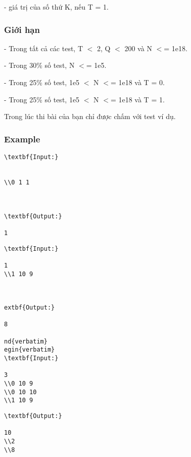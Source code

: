 - giá trị của số thứ K, nếu T = 1.

\subsubsection{Giới hạn}

- Trong tất cả các test, T $<$ 2, Q $<$ 200 và N $<$= 1e18.

- Trong 30\% số test, N $<$= 1e5.

- Trong 25\% số test, 1e5 $<$ N $<$= 1e18 và T = 0.

- Trong 25\% số test, 1e5 $<$ N $<$= 1e18 và T = 1.

Trong lúc thi bài của bạn chỉ được chấm với test ví dụ.

\subsubsection{Example}
\begin{verbatim}
\textbf{Input:}


\\0 1 1



\textbf{Output:}

1

\end{verbatim}
\begin{verbatim}
\textbf{Input:}

1
\\1 10 9



extbf{Output:}

8

nd{verbatim}
egin{verbatim}
\textbf{Input:}

3
\\0 10 9
\\0 10 10
\\1 10 9 \end{verbatim}
\begin{verbatim}
\textbf{Output:}

10
\\2
\\8 \end{verbatim}
